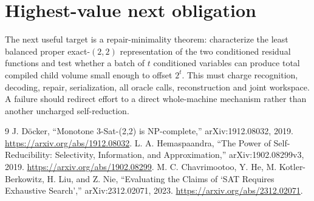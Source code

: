 \documentclass[11pt]{article}
\begin{document}
\section{Highest-value next obligation}
The next useful target is a repair-minimality theorem: characterize the least
balanced proper exact-$(2,2)$ representation of the two conditioned residual
functions and test whether a batch of $t$ conditioned variables can produce
total compiled child volume small enough to offset $2^t$.  This must charge
recognition, decoding, repair, serialization, all oracle calls, reconstruction
and joint workspace.  A failure should redirect effort to a direct
whole-machine mechanism rather than another uncharged self-reduction.

\begin{thebibliography}{9}
 J. D\"ocker, ``Monotone 3-Sat-(2,2) is NP-complete,''
arXiv:1912.08032, 2019. \url{https://arxiv.org/abs/1912.08032}.
 L. A. Hemaspaandra, ``The Power of Self-Reducibility:
Selectivity, Information, and Approximation,'' arXiv:1902.08299v3, 2019.
\url{https://arxiv.org/abs/1902.08299}.
 M. C. Chavrimootoo, Y. He, M. Kotler-Berkowitz,
H. Liu, and Z. Nie, ``Evaluating the Claims of `SAT Requires Exhaustive
Search','' arXiv:2312.02071, 2023.
\url{https://arxiv.org/abs/2312.02071}.
\end{thebibliography}
\end{document}
